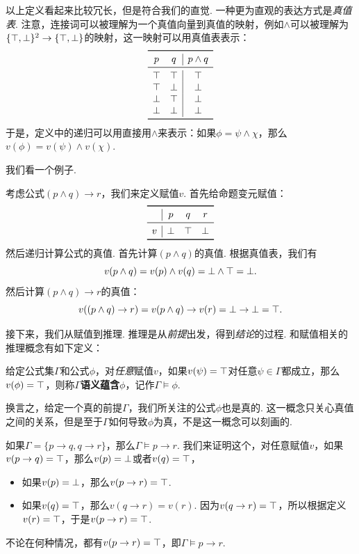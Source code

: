 以上定义看起来比较冗长，但是符合我们的直觉. 一种更为直观的表达方式是\textit{真值表}. 注意，连接词可以被理解为一个真值向量到真值的映射，例如$\wedge$可以被理解为$\{\top,\bot\}^2\to\{\top,\bot\}$的映射，这一映射可以用真值表表示：
\[
\begin{array}{cc|c}
    \toprule
    p & q & p\wedge q \\\midrule
    \T & \T & \T \\
    \T & \F & \F \\
    \F & \T & \F \\
    \F & \F & \F \\
    \bottomrule
\end{array}
\]
于是，定义中的递归可以用直接用$\wedge$来表示：如果$\phi=\psi\wedge\chi$，那么$v(\phi)=v(\psi)\wedge v(\chi)$.

我们看一个例子. 

\begin{example}
    考虑公式$(p\wedge q)\to r$，我们来定义赋值$v$. 首先给命题变元赋值：
    \[\begin{array}{c|ccc}
        \toprule
        &p&q&r\\\midrule
        v&\F&\T&\F\\
        \bottomrule
    \end{array}\]
    然后递归计算公式的真值. 首先计算$(p\wedge q)$的真值. 根据真值表，我们有
    \[v(p\wedge q)=v(p)\wedge v(q)=\bot\wedge\top=\bot.\]
    然后计算$(p\wedge q)\to r$的真值：
    \[v((p\wedge q)\to r)=v(p\wedge q)\to v(r)=\bot\to\bot=\top.\]    
\end{example}

接下来，我们从赋值到推理. 推理是从\textit{前提}出发，得到\textit{结论}的过程. 和赋值相关的推理概念有如下定义：

\begin{definition}[语义蕴含]
给定公式集$\Gamma$和公式$\phi$，对\textit{任意}赋值$v$，如果$v(\psi)=\top$对任意$\psi\in\Gamma$都成立，那么$v(\phi)=\top$，则称$\Gamma$\textbf{语义蕴含}$\phi$，记作$\Gamma\vDash\phi$.
\end{definition}

换言之，给定一个真的前提$\Gamma$，我们所关注的公式$\phi$也是真的. 这一概念只关心真值之间的关系，但是至于$\Gamma$如何导致$\phi$为真，不是这一概念可以刻画的. 

\begin{example}\label{ex:semantic-implication}
如果$\Gamma=\{p\to q,q\to r\}$，那么$\Gamma\vDash p\to r$. 我们来证明这个，对任意赋值$v$，如果$v(p\to q)=\top$，那么$v(p)=\bot$或者$v(q)=\top$，
\begin{itemize}
    \item 如果$v(p)=\bot$，那么$v(p\to r)=\top$.
    \item 如果$v(q)=\top$，那么$v(q\to r)=v(r)$. 因为$v(q\to r)=\top$，所以根据定义$v(r)=\top$，于是$v(p\to r)=\top$.
\end{itemize}
不论在何种情况，都有$v(p\to r)=\top$，即$\Gamma\vDash p\to r$.
\end{example}

